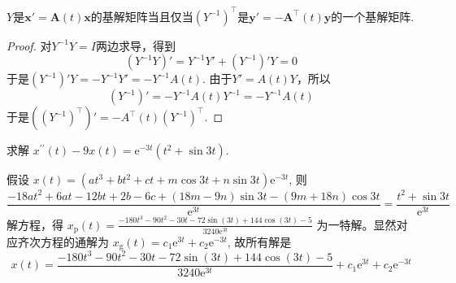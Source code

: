 \begin{exercise}
    $Y$是$\boldsymbol{x}'=\boldsymbol{A}(t)\boldsymbol{x}$的基解矩阵当且仅当$(Y^{-1})^{\top}$是$\boldsymbol{y}'=-\boldsymbol{A}^{\top}(t)\boldsymbol{y}$的一个基解矩阵.
\end{exercise}

\begin{proof}
    对$Y^{-1}Y=I$两边求导，得到
    \[
        (Y^{-1}Y)'=Y^{-1}Y'+(Y^{-1})'Y=0
    \]
    于是$(Y^{-1}) ' Y=-Y^{-1}Y'=-Y^{-1}A(t)$. 由于$Y'=A(t)Y$，所以
    \[
        (Y^{-1})'=-Y^{-1}A(t)Y^{-1}=-Y^{-1}A(t)
    \]
    于是$((Y^{-1})^{\top})'=-A^{\top}(t)(Y^{-1})^{\top}$.
\end{proof}

\begin{exercise}
    求解 $x^{\prime \prime}(t)-9 x(t)=\mathrm{e}^{-3 t}\left(t^2+\sin 3 t\right)$.
\end{exercise}
\begin{solution}
    假设 $x(t)=\left(a t^3+b t^2+c t+m \cos 3 t+n \sin 3 t\right) \mathrm{e}^{-3 t}$, 则
    \[
        \frac{-18 a t^2+6 a t-12 b t+2 b-6 c+(18 m-9 n) \sin 3 t-(9 m+18 n) \cos 3 t}{\mathrm{e}^{3 t}}=\frac{t^2+\sin 3 t}{\mathrm{e}^{3 t}}
    \]
    解方程，得 $x_{\mathrm{p}}(t)=\frac{-180 t^3-90 t^2-30 t-72 \sin (3 t)+144 \cos (3 t)-5}{3240 \mathrm{e}^{3 t}}$ 为一特解。显然对应齐次方程的通解为 $x_{\mathrm{g}}(t)=c_1 \mathrm{e}^{3 t}+c_2 \mathrm{e}^{-3 t}$, 故所有解是
    \[
        x(t)=\frac{-180 t^3-90 t^2-30 t-72 \sin (3 t)+144 \cos (3 t)-5}{3240 \mathrm{e}^{3 t}}+c_1 \mathrm{e}^{3 t}+c_2 \mathrm{e}^{-3 t}
    \]
\end{solution}

